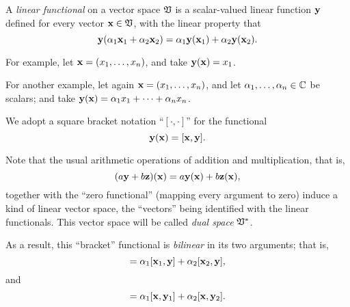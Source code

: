 A {\em linear functional}
on a vector space ${\frak V}$ is a scalar-valued linear function ${\bf y}$
defined for every vector   ${\bf x} \in {\frak V}$, with the linear property that
\begin{equation}
{\bf y} (\alpha_1 {\bf x}_1 +\alpha_2 {\bf x}_2)
=
\alpha_1 {\bf y} ({\bf x}_1) +\alpha_2 {\bf y} ({\bf x}_2) .
\end{equation}

{\color{blue}
\bexample
For example,
let ${\bf x} = (x_1,\ldots , x_n)$, and
take
${\bf y} ({\bf x}) =x_1$.

For another example,
let again ${\bf x} = (x_1,\ldots , x_n)$, and
let $\alpha_1,\ldots , \alpha_n \in {\Bbb C}$ be scalars; and
take
${\bf y} ({\bf x}) =\alpha_1 x_1 + \cdots +\alpha_n x_n$.
\eexample
}


We adopt a square bracket notation ``$[\cdot , \cdot ]$''
for the functional
\begin{equation}
{\bf y} ({\bf x})
=
[{\bf x},{\bf y}].
\end{equation}

Note that the usual arithmetic operations of addition and multiplication,
that is,
\begin{equation}
(a {\bf y} + b {\bf z}) ({\bf x})
=
a {\bf y} ({\bf x}) + b {\bf z} ({\bf x}) ,
\end{equation}
together with the ``zero functional''
(mapping every argument to zero)
induce a kind of linear vector space, the ``vectors''
being identified with the linear functionals.
This vector space will be called {\em dual space} ${\frak V}^*$.


As a result, this ``bracket'' functional is
{\em bilinear} in its two arguments; that is,
\begin{equation}
[ \alpha_1 {\bf x}_1 +\alpha_2 {\bf x}_2, {\bf y}]
=
\alpha_1 [{\bf x}_1 ,{\bf y}]  +\alpha_2  [{\bf x}_2,{\bf y}],
\end{equation}
and
\begin{equation}
[
{\bf x}, \alpha_1 {\bf y}_1 +\alpha_2 {\bf y}_2
]
=
\alpha_1
[{\bf x},{\bf y}_1 ]
+
\alpha_2
[{\bf x},{\bf y}_2].
\end{equation}


